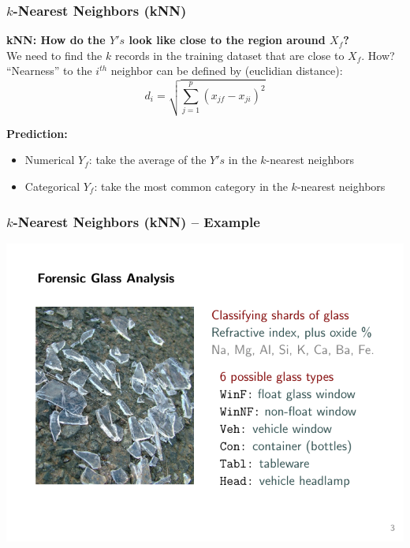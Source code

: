 \documentclass[flegn]{beamer}
\newcommand{\sko}{\vspace{.1in}}
\begin{document}
\begin{frame}
\frametitle{$k$-Nearest Neighbors (kNN)}

{\bf {\color{blue} kNN:} How do the $Y's$ look like close to the region around $X_f$?} \\ We need to find the {\color{red}$k$} records in the training dataset that are close to $X_f$. How? ``Nearness'' to the $i^{th}$ neighbor can be defined by (euclidian distance):
$$
d_i = \sqrt{\sum_{j=1}^p (x_{jf} - x_{ji})^2}
$$

\sko

{\bf Prediction:}
\begin{itemize}
\item Numerical $Y_f$: take the average of the $Y's$ in the $k$-nearest neighbors
\item Categorical $Y_f$: take the most common category in the $k$-nearest neighbors 
\end{itemize}


\end{frame}

\begin{frame}
\frametitle{$k$-Nearest Neighbors (kNN) -- Example}

\vspace{-0.5cm}

\begin{center}
\includegraphics{glass0}
\end{center}

\end{frame}
\end{document}
